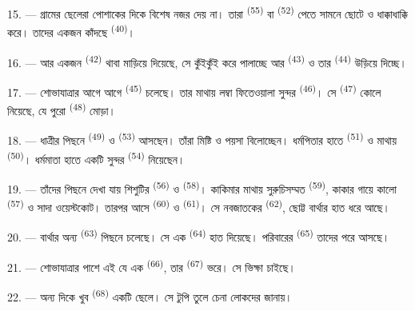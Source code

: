 15. --- গ্রামের ছেলেরা পোশাকের দিকে বিশেষ নজর দেয় না। তারা
 \textsuperscript{(55)} বা  \textsuperscript{(52)}
পেতে সামনে ছোটে ও ধাক্কাধাক্কি করে। তাদের একজন কাঁদছে \textsuperscript{(40)}।

16. --- আর একজন  \textsuperscript{(42)} থাবা মাড়িয়ে দিয়েছে,
সে কুঁইকুঁই করে পালাচ্ছে আর  \textsuperscript{(43)} ও তার
 \textsuperscript{(44)} উড়িয়ে দিচ্ছে।

\VUsaut{5.0mm}
\VUsaut{4.0mm}

17. --- শোভাযাত্রার আগে আগে  \textsuperscript{(45)} চলেছে। তার
মাথায় লম্বা ফিতেওয়ালা সুন্দর  \textsuperscript{(46)}। সে
 \textsuperscript{(47)} কোলে নিয়েছে, যে পুরো 
\textsuperscript{(48)} মোড়া।

18. --- ধাত্রীর পিছনে  \textsuperscript{(49)} ও
 \textsuperscript{(53)} আসছেন। তাঁরা মিষ্টি ও পয়সা বিলোচ্ছেন।
ধর্মপিতার হাতে  \textsuperscript{(51)} ও মাথায়  \textsuperscript{(50)}। ধর্মমাতা হাতে একটি সুন্দর 
\textsuperscript{(54)} নিয়েছেন।

19. --- তাঁদের পিছনে দেখা যায় শিশুটির  \textsuperscript{(56)} ও
 \textsuperscript{(58)}। কাকিমার মাথায় সুরুচিসম্মত
 \textsuperscript{(59)}, কাকার গায়ে কালো 
\textsuperscript{(57)} ও সাদা ওয়েস্টকোট। তারপর আসে 
\textsuperscript{(60)} ও  \textsuperscript{(61)}। সে নবজাতকের
 \textsuperscript{(62)}, ছোট্ট বার্থার হাত ধরে আছে।

20. --- বার্থার অন্য  \textsuperscript{(63)} পিছনে চলেছে। সে এক
 \textsuperscript{(64)} হাত দিয়েছে। পরিবারের
 \textsuperscript{(65)} তাদের পরে আসছে।

\VUsaut{4.6mm}
\VUsaut{3.4mm}

21. --- শোভাযাত্রার পাশে এই যে এক  \textsuperscript{(66)}, তার
 \textsuperscript{(67)} ভরে। সে ভিক্ষা চাইছে।

22. --- অন্য দিকে খুব  \textsuperscript{(68)} একটি ছেলে। সে টুপি
তুলে চেনা লোকদের  জানায়।

